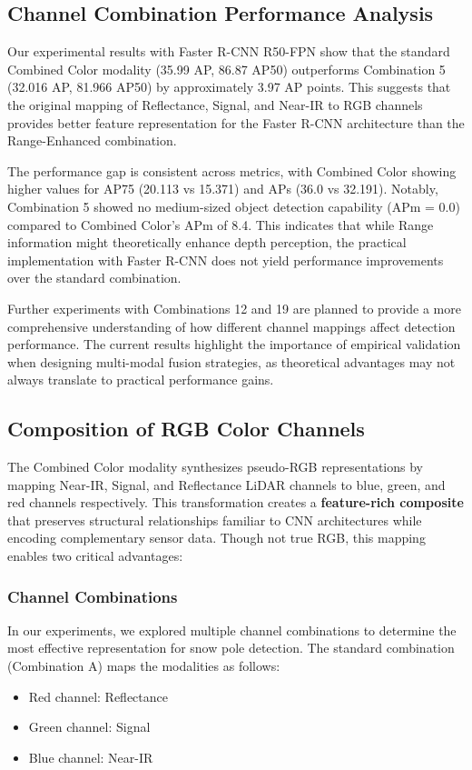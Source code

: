 \documentclass[11pt]{article}
\begin{document}
\subsection{Channel Combination Performance Analysis}
Our experimental results with Faster R-CNN R50-FPN show that the standard Combined Color modality (35.99 AP, 86.87 AP50) outperforms Combination 5 (32.016 AP, 81.966 AP50) by approximately 3.97 AP points. This suggests that the original mapping of Reflectance, Signal, and Near-IR to RGB channels provides better feature representation for the Faster R-CNN architecture than the Range-Enhanced combination.

The performance gap is consistent across metrics, with Combined Color showing higher values for AP75 (20.113 vs 15.371) and APs (36.0 vs 32.191). Notably, Combination 5 showed no medium-sized object detection capability (APm = 0.0) compared to Combined Color's APm of 8.4. This indicates that while Range information might theoretically enhance depth perception, the practical implementation with Faster R-CNN does not yield performance improvements over the standard combination.

Further experiments with Combinations 12 and 19 are planned to provide a more comprehensive understanding of how different channel mappings affect detection performance. The current results highlight the importance of empirical validation when designing multi-modal fusion strategies, as theoretical advantages may not always translate to practical performance gains.

\subsection{Composition of RGB Color Channels}  
The Combined Color modality synthesizes pseudo-RGB representations by mapping Near-IR, Signal, and Reflectance LiDAR channels to blue, green, and red channels respectively. This transformation creates a \textbf{feature-rich composite} that preserves structural relationships familiar to CNN architectures while encoding complementary sensor data. Though not true RGB, this mapping enables two critical advantages:

\subsubsection{Channel Combinations}
In our experiments, we explored multiple channel combinations to determine the most effective representation for snow pole detection. The standard combination (Combination A) maps the modalities as follows:
\begin{itemize}
    \item Red channel: Reflectance
    \item Green channel: Signal
    \item Blue channel: Near-IR
\end{itemize}
\end{document}
